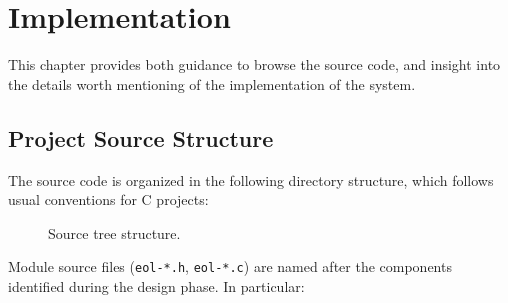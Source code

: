 
\cleardoublepage
\setchaptertoc
\chapter{Implementation}

This chapter provides both guidance to browse the \Eol* source code, and
insight into the details worth mentioning of the implementation of the system.



\section{Project Source Structure}

The \Eol* source code is organized in the following directory structure, which
follows usual conventions for C projects:

\begin{figure}[h]
    \centering
    \noindent\begin{minipage}{0.75\textwidth}
    \end{minipage}
    \caption{Source tree structure.}
\end{figure}

Module source files (\verb|eol-*.h|, \verb|eol-*.c|) are named after the
components identified during the design phase. In particular:


